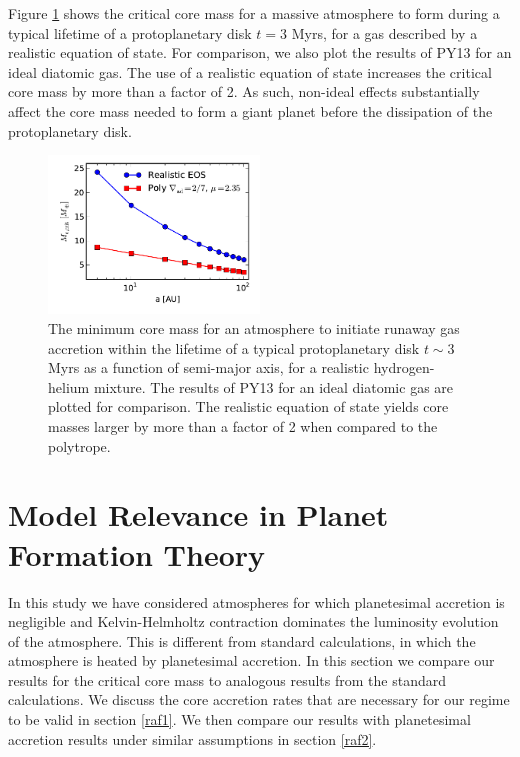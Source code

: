 \documentclass[apj]{emulateapj}
\begin{document}


Figure \ref{fig:Mvsaplot} shows the critical core mass for a massive atmosphere to form during a typical lifetime of a protoplanetary disk $t=3$ Myrs, for a gas described by a realistic equation of state. For comparison, we also plot the results of PY13 for an ideal diatomic gas. The use of a realistic equation of state increases the critical core mass by more than a factor of 2. As such, non-ideal effects substantially affect the core mass needed to form a giant planet  before the dissipation of the protoplanetary disk.   

\begin{figure}[h!]
\centering
\includegraphics[width=0.5\textwidth]{../../figs/ModelAtmospheres/RadSelfGravRealEOS/PaperFigs/Mc_vs_a_poly_real_paper.pdf}
\caption{The minimum core mass for an atmosphere to initiate runaway gas accretion within the lifetime of a typical protoplanetary disk $t \sim 3$ Myrs as a function of semi-major axis, for a realistic hydrogen-helium mixture. The results of PY13 for an ideal diatomic gas are plotted for comparison. The realistic equation of state yields core masses larger by more than a factor of 2 when compared to the polytrope.}
\label{fig:Mvsaplot}
\end{figure}


\section{Model Relevance in Planet Formation Theory}
\label{acc}

In this study we have considered atmospheres for which planetesimal accretion is negligible and Kelvin-Helmholtz contraction dominates the luminosity evolution of the atmosphere. This is different from standard calculations, in which the atmosphere is heated by planetesimal accretion. In this section we compare our results for the critical core mass to analogous results from the standard calculations. We discuss the core accretion rates that are necessary for our regime to be valid in section \ref{raf1}. We then compare our results with planetesimal accretion results under similar assumptions in section \ref{raf2}.
\end{document}
